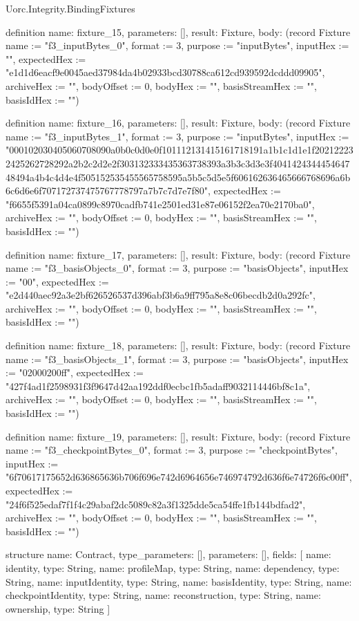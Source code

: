 \begin{lexlean}{Uorc.Integrity.BindingFixtures}
\begin{semanticmodule}
definition{
  name: fixture_15,
  parameters: [],
  result: Fixture,
  body: (record Fixture {name := "f3_inputBytes_0", format := 3, purpose := "inputBytes", inputHex := "", expectedHex := "e1d1d6eacf9e0045aed37984da4b02933bcd30788ca612cd939592dcddd09905", archiveHex := "", bodyOffset := 0, bodyHex := "", basisStreamHex := "", basisIdHex := ""})
}

definition{
  name: fixture_16,
  parameters: [],
  result: Fixture,
  body: (record Fixture {name := "f3_inputBytes_1", format := 3, purpose := "inputBytes", inputHex := "000102030405060708090a0b0c0d0e0f101112131415161718191a1b1c1d1e1f202122232425262728292a2b2c2d2e2f303132333435363738393a3b3c3d3e3f404142434445464748494a4b4c4d4e4f505152535455565758595a5b5c5d5e5f606162636465666768696a6b6c6d6e6f707172737475767778797a7b7c7d7e7f80", expectedHex := "f6655f5391a04ca0899c8970cadfb741e2501ed31e87e06152f2ea70e2170ba0", archiveHex := "", bodyOffset := 0, bodyHex := "", basisStreamHex := "", basisIdHex := ""})
}

definition{
  name: fixture_17,
  parameters: [],
  result: Fixture,
  body: (record Fixture {name := "f3_basisObjects_0", format := 3, purpose := "basisObjects", inputHex := "00", expectedHex := "e2d440aec92a3e2bf626526537d396abf3b6a9ff795a8e8c06becdb2d0a292fc", archiveHex := "", bodyOffset := 0, bodyHex := "", basisStreamHex := "", basisIdHex := ""})
}

definition{
  name: fixture_18,
  parameters: [],
  result: Fixture,
  body: (record Fixture {name := "f3_basisObjects_1", format := 3, purpose := "basisObjects", inputHex := "02000200ff", expectedHex := "427f4ad1f2598931f3f9647d42aa192ddf0ecbc1fb5adaff9032114446bf8c1a", archiveHex := "", bodyOffset := 0, bodyHex := "", basisStreamHex := "", basisIdHex := ""})
}

definition{
  name: fixture_19,
  parameters: [],
  result: Fixture,
  body: (record Fixture {name := "f3_checkpointBytes_0", format := 3, purpose := "checkpointBytes", inputHex := "6f70617175652d636865636b706f696e742d6964656e746974792d636f6e74726f6c00ff", expectedHex := "24f6f525edaf7f1f4c29abaf2dc5089c82a3f1325dde5ca54ffe1fb144bdfad2", archiveHex := "", bodyOffset := 0, bodyHex := "", basisStreamHex := "", basisIdHex := ""})
}

structure{
  name: Contract,
  type_parameters: [],
  parameters: [],
  fields: [
    {name: identity, type: String},
    {name: profileMap, type: String},
    {name: dependency, type: String},
    {name: inputIdentity, type: String},
    {name: basisIdentity, type: String},
    {name: checkpointIdentity, type: String},
    {name: reconstruction, type: String},
    {name: ownership, type: String}
  ]
}


\end{semanticmodule}
\end{lexlean}
